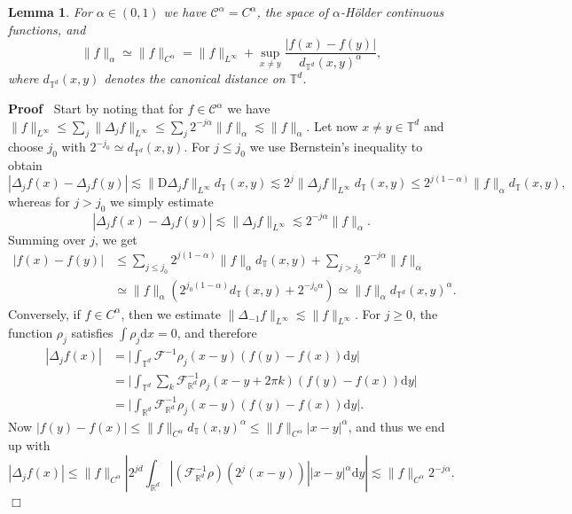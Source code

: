\documentclass[a4paper,11pt]{article}
\newcommand{\mathD}{\mathrm{D}}
\newcommand{\mathd}{\mathrm{d}}
\newenvironment{proof}{\noindent\textbf{Proof\ }}{\hspace*{\fill}$\Box$\medskip}
\newtheorem{lemma}{Lemma}
{\theorembodyfont{\rmfamily}\newtheorem{remark}{Remark}}
\newcommand{\CF}{\mathscr{F}}
\newcommand{\CC}{\mathscr{C}}
\begin{document}
\begin{lemma}
  For $\alpha \in (0, 1)$ we have $\CC^{\alpha} = C^{\alpha}$, the space of
  $\alpha$-H{\"o}lder continuous functions, and
  \[ \| f \|_{\alpha} \simeq \| f \|_{C^{\alpha}} = \| f \|_{L^{\infty}} +
     \sup_{x \neq y} \frac{| f (x) - f (y) |}{d_{\mathbb{T}^d} (x,
     y)^{\alpha}}, \]
  where $d_{\mathbb{T}^d} (x, y)$ denotes the canonical distance on
  $\mathbb{T}^d$.
\end{lemma}

\begin{proof}
  Start by noting that for $f \in \CC^{\alpha}$ we have $\| f \|_{L^{\infty}}
  \leqslant \sum_j \| \Delta_j f \|_{L^{\infty}} \leqslant \sum_j 2^{- j
  \alpha} \| f \|_{\alpha} \lesssim \| f \|_{\alpha}$. Let now $x \neq y \in
  \mathbb{T}^d$ and choose $j_0$ with $2^{- j_0} \simeq d_{\mathbb{T}^d} (x,
  y)$. For $j \leqslant j_0$ we use Bernstein's inequality to obtain
  \[ | \Delta_j f (x) - \Delta_j f (y) | \lesssim \| \mathD \Delta_j f
     \|_{L^{\infty}} d_{\mathbb{T}} (x, y) \lesssim 2^j \| \Delta_j f
     \|_{L^{\infty}} d_{\mathbb{T}} (x, y) \leqslant 2^{j (1 - \alpha)} \| f
     \|_{\alpha} d_{\mathbb{T}} (x, y), \]
  whereas for $j > j_0$ we simply estimate
  \[ | \Delta_j f (x) - \Delta_j f (y) | \lesssim \| \Delta_j f
     \|_{L^{\infty}} \lesssim 2^{- j \alpha} \| f \|_{\alpha} . \]
  Summing over $j$, we get
  \begin{align*}
     | f (x) - f (y) | & \leqslant \sum_{j \leqslant j_0} 2^{j (1 - \alpha)} \| f \|_{\alpha} d_{\mathbb{T}} (x, y) + \sum_{j > j_0} 2^{- j \alpha} \| f \|_{\alpha} \\
     & \simeq \| f \|_{\alpha} (2^{j_0 (1 - \alpha)} d_{\mathbb{T}} (x, y) +  2^{- j_0 \alpha}) \simeq \| f \|_{\alpha} d_{\mathbb{T}^d} (x, y)^{\alpha}.
  \end{align*}
  Conversely, if $f \in C^{\alpha}$, then we estimate $\| \Delta_{- 1} f
  \|_{L^{\infty}} \lesssim \| f \|_{L^{\infty}}$. For $j \geqslant 0$, the
  function $\rho_j$ satisfies $\int \rho_j \mathd x = 0$, and therefore
  \begin{align*}
     | \Delta_j f (x) | & = \Big| \int_{\mathbb{T}^d} \CF^{- 1} \rho_j (x - y) (f (y) - f (x)) \mathd y \Big| \\
     & = \Big| \int_{\mathbb{T}^d} \sum_k \CF^{- 1}_{\mathbb{R}^d} \rho_j (x - y + 2 \pi k) (f (y) - f (x)) \mathd y \Big| \\
     & = \Big| \int_{\mathbb{R}^d} \CF^{- 1}_{\mathbb{R}^d} \rho_j (x - y) (f(y) - f (x)) \mathd y \Big|.
  \end{align*}
  Now $| f (y) - f (x) | \leqslant \| f \|_{C^{\alpha}} d_{\mathbb{T}} (x,
  y)^{\alpha} \leqslant \| f \|_{C^{\alpha}} | x - y |^{\alpha}$, and
  thus we end up with
  \[ | \Delta_j f (x) | \leqslant \| f \|_{C^{\alpha}} \left| 2^{j d}
     \int_{\mathbb{R}^d} \left| \left( \CF^{- 1}_{\mathbb{R}^d} \rho \right)
     (2^j (x - y)) \right|  | x - y |^{\alpha} \mathd y \right| \lesssim \| f
     \|_{C^{\alpha}} 2^{- j \alpha} . \]
\end{proof}
\end{document}
